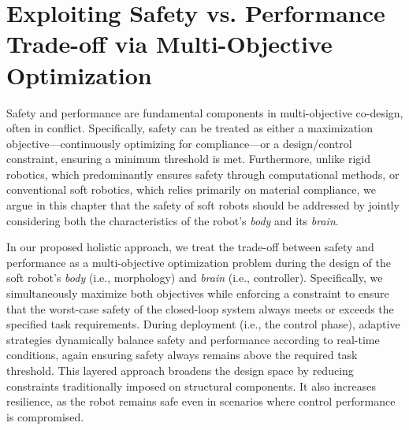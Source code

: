 \section{Exploiting Safety vs. Performance Trade-off via Multi-Objective Optimization}\label{sec:apx:holisticcodesign:safety_vs_performance_tradeoff}

Safety and performance are fundamental components in multi-objective co-design, often in conflict. Specifically, safety can be treated as either a maximization objective—continuously optimizing for compliance—or a design/control constraint, ensuring a minimum threshold is met.
Furthermore, unlike rigid robotics, which predominantly ensures safety through computational methods, or conventional soft robotics, which relies primarily on material compliance, we argue in this chapter that the safety of soft robots should be addressed by jointly considering both the characteristics of the robot’s \emph{body} and its \emph{brain}.

In our proposed holistic approach, we treat the trade-off between safety and performance as a multi-objective optimization problem during the design of the soft robot’s \emph{body} (i.e., morphology) and \emph{brain} (i.e., controller). Specifically, we simultaneously maximize both objectives while enforcing a constraint to ensure that the worst-case safety of the closed-loop system always meets or exceeds the specified task requirements. During deployment (i.e., the control phase), adaptive strategies dynamically balance safety and performance according to real-time conditions, again ensuring safety always remains above the required task threshold.
This layered approach broadens the design space by reducing constraints traditionally imposed on structural components. It also increases resilience, as the robot remains safe even in scenarios where control performance is compromised.